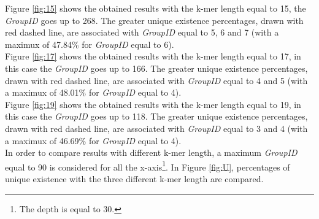 \documentclass[11pt]{article}
\begin{document}
\vspace{6mm}
\noindent
Figure \ref{fig:15} shows the obtained results with the k-mer length equal to 15, the \emph{GroupID} goes up to 268.
The greater unique existence percentages, drawn with red dashed line, are associated with \emph{GroupID} equal to 5, 6 and 7 (with a maximux of 47.84\% for \emph{GroupID} equal to 6).\\
Figure \ref{fig:17} shows the obtained results with the k-mer length equal to 17, in this case the \emph{GroupID} goes up to 166.
The greater unique existence percentages, drawn with red dashed line, are associated with \emph{GroupID} equal to 4 and 5 (with a maximux of 48.01\% for \emph{GroupID} equal to 4).\\
Figure \ref{fig:19} shows the obtained results with the k-mer length equal to 19, in this case the \emph{GroupID} goes up to 118.
The greater unique existence percentages, drawn with red dashed line, are associated with \emph{GroupID} equal to 3 and 4 (with a maximux of 46.69\% for \emph{GroupID} equal to 4).\\
In order to compare results with different k-mer length, a maximum \emph{GroupID} equal to 90 is considered for all the x-axis\footnote{The depth is equal to 30.}.
In Figure \ref{fig:U}, percentages of unique existence with the three different k-mer length are compared.\\
\end{document}
